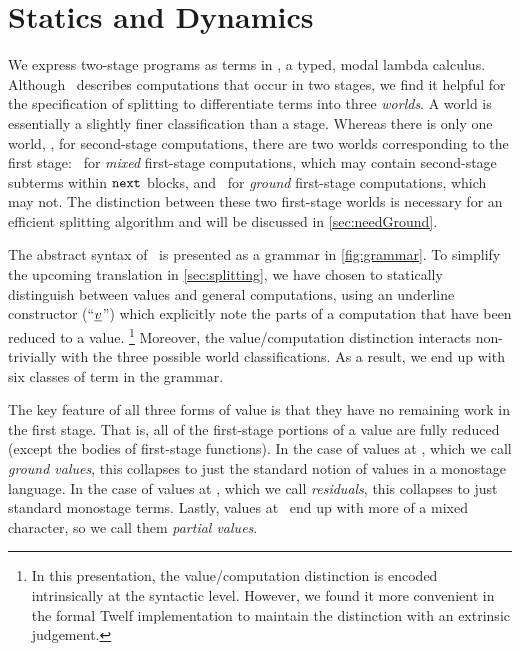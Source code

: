 
\section{\texorpdfstring{\lang}{λ12} Statics and Dynamics}
\label{sec:semantics}



We express two-stage programs as terms in \lang, a typed, modal lambda calculus. 
Although \lang\ describes computations that occur in two stages,
we find it helpful for the specification of splitting to differentiate terms into three \emph{worlds}.
A world is essentially a slightly finer classification than a stage.
Whereas there is only one world, \bbtwo, for second-stage computations,
there are two worlds corresponding to the first stage:
\bbonem\ for \emph{mixed} first-stage computations, which may contain second-stage subterms within ${\tt next}$ blocks,
and \bbonep\ for \emph{ground} first-stage computations, which may not.
The distinction between these two first-stage worlds is necessary for an efficient splitting algorithm
and will be discussed in \ref{sec:needGround}.

The abstract syntax of \lang\ is presented as a grammar in \ref{fig:grammar}.  
To simplify the upcoming translation in \ref{sec:splitting}, 
we have chosen to statically distinguish between values and general computations,
using an underline constructor (``$\underline{\smash{v}}$'') which explicitly note the parts of a computation that have been reduced to a value.
\footnote{In this presentation, the value/computation distinction is encoded intrinsically at the syntactic level.
However, we found it more convenient in the formal Twelf implementation to maintain the distinction with an extrinsic judgement.}
Moreover, the value/computation distinction interacts non-trivially with the three possible world classifications.
As a result, we end up with six classes of term in the grammar.

The key feature of all three forms of value is that they have no remaining work in the first stage.
That is, all of the first-stage portions of a value are fully reduced (except the bodies of first-stage functions).
In the case of values at \bbonep, which we call \emph{ground values}, this collapses to just the standard notion of values in a monostage language.
In the case of values at \bbtwo, which we call \emph{residuals}, this collapses to just standard monostage terms.
Lastly, values at \bbonem\ end up with more of a mixed character, so we call them \emph{partial values}.

